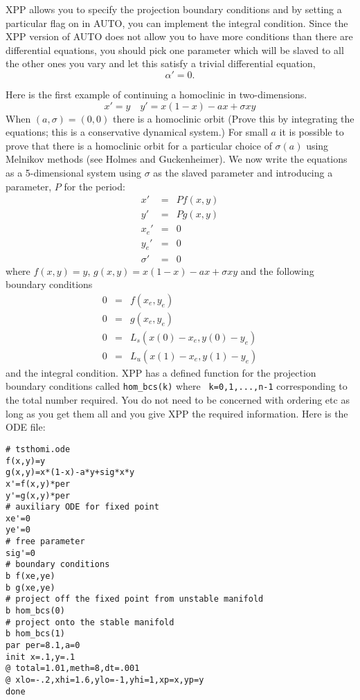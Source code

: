 \documentclass{article}
\begin{document}
XPP allows you to specify the projection boundary conditions and by
setting a particular flag on in AUTO, you can implement the integral
condition.  Since the XPP version of AUTO does not allow you to have
more conditions than there are differential equations, you should pick
one parameter which will be slaved to all the other ones you vary and
let this satisfy a trivial differential equation,
\[
\alpha'=0.
\]   

Here is the first example of continuing a homoclinic in
two-dimensions. 
\[
x'=y \quad y'=x(1-x)-ax+\sigma xy 
\]
When $(a,\sigma)=(0,0)$ there is a homoclinic orbit (Prove this by
integrating the equations; this is a conservative dynamical system.)
For small $a$ it is possible to prove that there is a homoclinic orbit
for a particular choice of $\sigma(a)$ using Melnikov methods (see
Holmes and Guckenheimer).  We now write the equations as a
5-dimensional system using $\sigma$ as the slaved parameter and
introducing a parameter, $P$ for the period:
\begin{eqnarray*}
x' &=& P f(x,y) \\
y' &=& P g(x,y)  \\
x_e' &=& 0 \\
y_e' &=& 0   \\
\sigma' &=& 0
\end{eqnarray*}
where $f(x,y)=y$, $g(x,y)=x(1-x)-ax+\sigma xy $ and the following
boundary conditions
\begin{eqnarray*}
0 &=& f(x_e,y_e) \\
0 &=& g(x_e,y_e) \\
0 &=& L_s (x(0)-x_e,y(0)-y_e)      \\
0 &=& L_u (x(1)-x_e,y(1)-y_e)  
\end{eqnarray*}
and the integral condition.  XPP has a defined function for the
projection boundary conditions called {\tt hom\_bcs(k)} where {\tt
k=0,1,...,n-1} corresponding to the total number required. You do not
need to be concerned with ordering etc as long as you get them all and
you give XPP the required information. Here is the ODE file:
\begin{verbatim}
# tsthomi.ode
f(x,y)=y
g(x,y)=x*(1-x)-a*y+sig*x*y
x'=f(x,y)*per
y'=g(x,y)*per
# auxiliary ODE for fixed point
xe'=0
ye'=0
# free parameter
sig'=0
# boundary conditions
b f(xe,ye)
b g(xe,ye)
# project off the fixed point from unstable manifold
b hom_bcs(0)
# project onto the stable manifold
b hom_bcs(1)
par per=8.1,a=0
init x=.1,y=.1
@ total=1.01,meth=8,dt=.001
@ xlo=-.2,xhi=1.6,ylo=-1,yhi=1,xp=x,yp=y
done
\end{verbatim}
\end{document}
